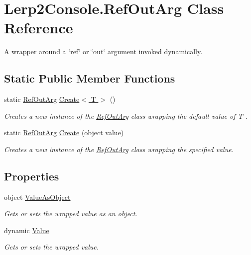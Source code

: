 \hypertarget{class_lerp2_console_1_1_ref_out_arg}{}\section{Lerp2\+Console.\+Ref\+Out\+Arg Class Reference}
\label{class_lerp2_console_1_1_ref_out_arg}


A wrapper around a \char`\"{}ref\char`\"{} or \char`\"{}out\char`\"{} argument invoked dynamically.  


\subsection*{Static Public Member Functions}
\begin{DoxyCompactItemize}
\item 
static \hyperlink{class_lerp2_console_1_1_ref_out_arg}{Ref\+Out\+Arg} \hyperlink{class_lerp2_console_1_1_ref_out_arg_afd558c2b6a220cc05a6af16593f67248}{Create$<$ T $>$} ()
\begin{DoxyCompactList}\small\item\em Creates a new instance of the \hyperlink{class_lerp2_console_1_1_ref_out_arg}{Ref\+Out\+Arg} class wrapping the default value of {\itshape T} . \end{DoxyCompactList}\item 
static \hyperlink{class_lerp2_console_1_1_ref_out_arg}{Ref\+Out\+Arg} \hyperlink{class_lerp2_console_1_1_ref_out_arg_a66bfca7b6fa2e3980651c17711db0e15}{Create} (object value)
\begin{DoxyCompactList}\small\item\em Creates a new instance of the \hyperlink{class_lerp2_console_1_1_ref_out_arg}{Ref\+Out\+Arg} class wrapping the specified value. \end{DoxyCompactList}\end{DoxyCompactItemize}
\subsection*{Properties}
\begin{DoxyCompactItemize}
\item 
object \hyperlink{class_lerp2_console_1_1_ref_out_arg_aaabb1ec3f5ae44dd05434dded84dfc3b}{Value\+As\+Object}
\begin{DoxyCompactList}\small\item\em Gets or sets the wrapped value as an object. \end{DoxyCompactList}\item 
dynamic \hyperlink{class_lerp2_console_1_1_ref_out_arg_a96b201679513e98ee66bd4418a64b7ab}{Value}
\begin{DoxyCompactList}\small\item\em Gets or sets the wrapped value. \end{DoxyCompactList}\end{DoxyCompactItemize}


